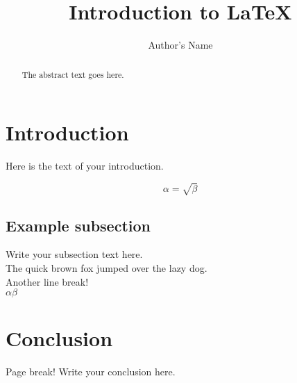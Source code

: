 \documentclass{article}
\begin{document}
\title{Introduction to \LaTeX{}}
\author{Author's Name}

\maketitle

\begin{abstract}
The abstract text goes here.\\
\end{abstract}

\section{Introduction}
Here is the text of your introduction.

\begin{equation}
	\label{simple_equation}
	\alpha = \sqrt{ \beta }
\end{equation}

\subsection{Example subsection}
Write your subsection text here. \\ The quick brown fox jumped over the lazy dog.
\\ Another line break! \\ $\alpha\beta$

\newpage
\section{Conclusion}
Page break!
Write your conclusion here.
\end{document}
